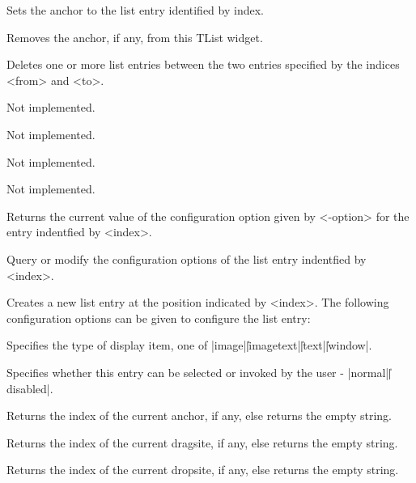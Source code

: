 \begin{enum}{1cm}

Sets the anchor to the list entry identified by index.

Removes the anchor, if any, from this TList widget.

Deletes one or more list entries between the two
entries specified by the indices <from> and <to>.

Not implemented.

Not implemented.

Not implemented.

Not implemented.

Returns the current value of the configuration option
given by <-option> for the entry indentfied by <index>.

Query or modify the configuration options of the list
entry indentfied by <index>.

Creates a new list entry at the position indicated by
<index>. The following configuration options can be
given to configure the list entry:

Specifies the type of display item, one of |image|\||imagetext|\||text|\||window|.

Specifies whether this entry can be selected
or invoked by the user - |normal|\||disabled|.

Returns the index of the current anchor, if any, else
returns the empty string.

Returns the index of the current dragsite, if any, else
returns the empty string.

Returns the index of the current dropsite, if
any, else returns the empty string.


\end{enum}
